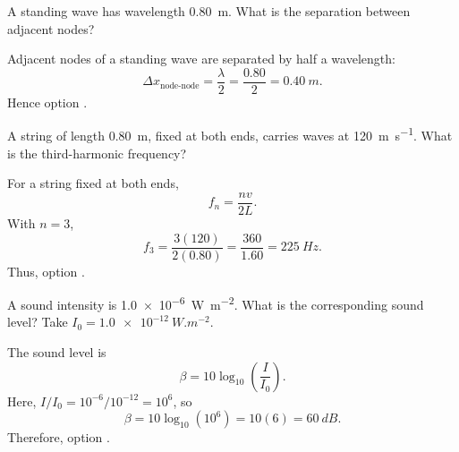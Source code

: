 \begin{quizquestion}[
  id=phy104-wave-013,
  topic=waves-and-sound,
  difficulty=foundation,
  marks=1,
  correct=B,
  tags={standing-wave,nodes,wavelength},
  outcome={Relate node spacing to wavelength}
]
  A standing wave has wavelength \SI{0.80}{m}. What is the separation between adjacent nodes?
\end{quizquestion}
\begin{quizsolution}
  Adjacent nodes of a standing wave are separated by half a wavelength:
    \[
      \Delta x_{\text{node-node}}=\frac{\lambda}{2}
      =\frac{0.80}{2}=\SI{0.40}{m}.
    \]
    Hence option \textbf{\quizcorrectletter}.
\end{quizsolution}

\begin{quizquestion}[
  id=phy104-wave-014,
  topic=waves-and-sound,
  difficulty=foundation,
  marks=1,
  correct=E,
  tags={string,harmonics,frequency},
  outcome={Calculate a string harmonic frequency}
]
  A string of length \SI{0.80}{m}, fixed at both ends, carries waves at \SI{120}{m.s^{-1}}. What is the third-harmonic frequency?
\end{quizquestion}
\begin{quizsolution}
  For a string fixed at both ends,
    \[
      f_n=\frac{nv}{2L}.
    \]
    With \(n=3\),
    \[
      f_3=\frac{3(120)}{2(0.80)}=\frac{360}{1.60}=\SI{225}{Hz}.
    \]
    Thus, option \textbf{\quizcorrectletter}.
\end{quizsolution}

\begin{quizquestion}[
  id=phy104-wave-015,
  topic=waves-and-sound,
  difficulty=foundation,
  marks=1,
  correct=C,
  tags={sound,intensity-level,decibel},
  outcome={Convert sound intensity to intensity level}
]
  A sound intensity is \SI{1.0e-6}{W.m^{-2}}. What is the corresponding sound level? Take \(I_0=\SI{1.0e-12}{W.m^{-2}}\).
\end{quizquestion}
\begin{quizsolution}
  The sound level is
    \[
      \beta=10\log_{10}\left(\frac{I}{I_0}\right).
    \]
    Here, \(I/I_0=10^{-6}/10^{-12}=10^6\), so
    \[
      \beta=10\log_{10}(10^6)=10(6)=\SI{60}{dB}.
    \]
    Therefore, option \textbf{\quizcorrectletter}.
\end{quizsolution}

